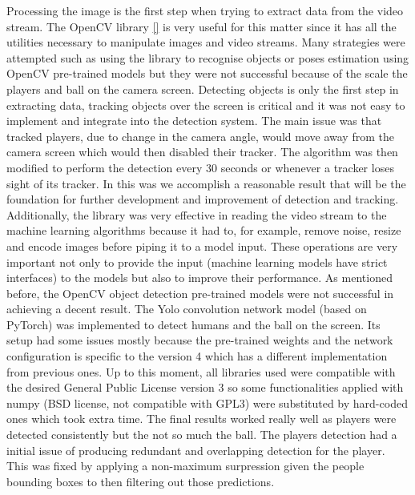\documentclass[
11pt,
twoside
]{report}
\begin{document}
Processing the image is the first step when trying to extract data from the video stream. The OpenCV library \ref{} is very useful for this matter since it has all the utilities necessary to manipulate images and video streams. Many strategies were attempted such as using the library to recognise objects or poses estimation using OpenCV pre-trained models but they were not successful because of the scale the players and ball on the camera screen. Detecting objects is only the first step in extracting data, tracking objects over the screen is critical and it was not easy to implement and integrate into the detection system. The main issue was that tracked players, due to change in the camera angle, would move away from the camera screen which would then disabled their tracker. The algorithm was then modified to perform the detection every 30 seconds or whenever a tracker loses sight of its tracker. In this was we accomplish a reasonable result that will be the foundation for further development and improvement of detection and tracking. Additionally, the library was very effective in reading the video stream to the machine learning algorithms because it had to, for example, remove noise, resize and encode images before piping it to a model input. These operations are very important not only to provide the input (machine learning models have strict interfaces) to the models but also to improve their performance.
As mentioned before, the OpenCV object detection pre-trained models were not successful in achieving a decent result. The Yolo convolution network model (based on PyTorch) was implemented to detect humans and the ball on the screen. Its setup had some issues mostly because the pre-trained weights and the network configuration is specific to the version 4 which has a different implementation from previous ones. Up to this moment, all libraries used were compatible with the desired General Public License version 3 so some functionalities applied with numpy (BSD license, not compatible with GPL3) were substituted by hard-coded ones which took extra time. The final results worked really well as players were detected consistently but the not so much the ball. The players detection had a initial issue of producing redundant and overlapping detection for the player. This was fixed by applying a non-maximum surpression given the people bounding boxes to then filtering out those predictions.
\end{document}
